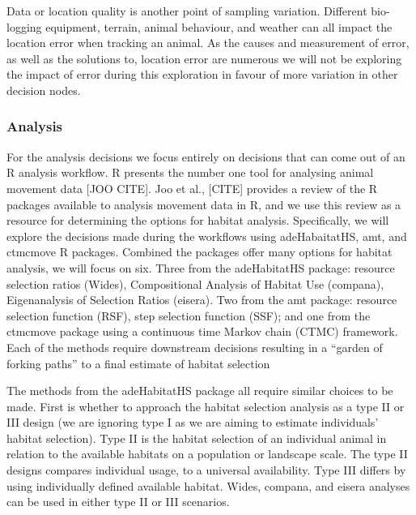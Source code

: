 \documentclass[10pt,a4paper]{article}
\begin{document}
Data or location quality is another point of sampling variation.
Different bio-logging equipment, terrain, animal behaviour, and weather can all impact the location error when tracking an animal.
As the causes and measurement of error, as well as the solutions to, location error are numerous we will not be exploring the impact of error during this exploration in favour of more variation in other decision nodes.

\hypertarget{analysis}{%
\subsubsection{Analysis}\label{analysis}}

For the analysis decisions we focus entirely on decisions that can come out of an R analysis workflow.
R presents the number one tool for analysing animal movement data {[}JOO CITE{]}.
Joo et al., {[}CITE{]} provides a review of the R packages available to analysis movement data in R, and we use this review as a resource for determining the options for habitat analysis.
Specifically, we will explore the decisions made during the workflows using adeHabaitatHS, amt, and ctmcmove R packages.
Combined the packages offer many options for habitat analysis, we will focus on six.
Three from the adeHabitatHS package: resource selection ratios (Wides), Compositional Analysis of Habitat Use (compana), Eigenanalysis of Selection Ratios (eisera).
Two from the amt package: resource selection function (RSF), step selection function (SSF); and one from the ctmcmove package using a continuous time Markov chain (CTMC) framework.
Each of the methods require downstream decisions resulting in a ``garden of forking paths'' to a final estimate of habitat selection

The methods from the adeHabitatHS package all require similar choices to be made.
First is whether to approach the habitat selection analysis as a type II or III design (we are ignoring type I as we are aiming to estimate individuals' habitat selection).
Type II is the habitat selection of an individual animal in relation to the available habitats on a population or landscape scale.
The type II designs compares individual usage, to a universal availability.
Type III differs by using individually defined available habitat.
Wides, compana, and eisera analyses can be used in either type II or III scenarios.
\end{document}
